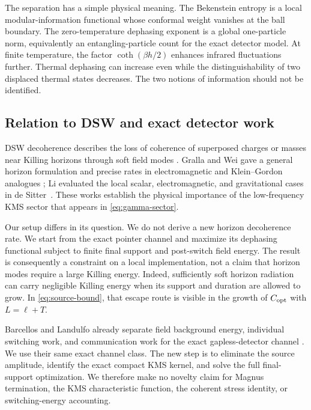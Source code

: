 The separation has a simple physical meaning.  The Bekenstein entropy is a
local modular-information functional whose conformal weight vanishes at the
ball boundary.  The zero-temperature dephasing exponent is a global
one-particle norm, equivalently an entangling-particle count for the exact
detector model.  At finite temperature, the factor $\coth(\beta h/2)$ enhances
infrared fluctuations further.  Thermal dephasing can increase even while the
distinguishability of two displaced thermal states decreases.  The two notions
of information should not be identified.

\subsection{Relation to DSW and exact detector work}

DSW decoherence describes the loss of coherence of superposed charges or
masses near Killing horizons through soft field modes
\cite{DSW2023,DSW2025}.  Gralla and Wei gave a general horizon formulation and
precise rates in electromagnetic and Klein--Gordon analogues
\cite{GrallaWei2024}; Li evaluated the local scalar, electromagnetic, and
gravitational cases in de Sitter~\cite{Li2025}.  These works establish the
physical importance of the low-frequency KMS sector that appears in
\cref{eq:gamma-sector}.

Our setup differs in its question.  We do not derive a new horizon decoherence
rate.  We start from the exact pointer channel and maximize its dephasing
functional subject to finite final support and post-switch field energy.  The
result is consequently a constraint on a local implementation, not a claim
that horizon modes require a large Killing energy.  Indeed, sufficiently soft
horizon radiation can carry negligible Killing energy when its support and
duration are allowed to grow.  In \cref{eq:source-bound}, that escape route is
visible in the growth of $C_{\rm opt}$ with $L=\ell+T$.

Barcellos and Landulfo already separate field background energy, individual
switching work, and communication work for the exact gapless-detector channel
\cite{BarcellosLandulfo2021}.  We use their same exact channel class.  The new
step is to eliminate the source amplitude, identify the exact compact KMS
kernel, and solve the full final-support optimization.  We therefore make no
novelty claim for Magnus termination, the KMS characteristic function, the
coherent stress identity, or switching-energy accounting.

